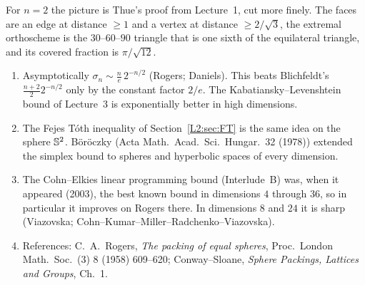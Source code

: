 For $n=2$ the picture is Thue's proof from Lecture~1, cut more finely. The faces are an edge at
distance $\ge1$ and a vertex at distance $\ge2/\sqrt3$, the extremal orthoscheme is the $30$--$60$--$90$
triangle that is one sixth of the equilateral triangle, and its covered fraction is $\pi/\sqrt{12}$.

\begin{remark}
\begin{enumerate}[nosep]
\item Asymptotically $\sigma_n\sim\frac{n}{e}\,2^{-n/2}$ (Rogers; Daniels). This beats Blichfeldt's
  $\frac{n+2}{2}2^{-n/2}$ only by the constant factor $2/e$. The Kabatiansky--Levenshtein bound of
  Lecture~3 is exponentially better in high dimensions.
\item The Fejes T\'oth inequality of Section~\ref{L2:sec:FT} is the same idea on the sphere $\mathbb{S}^2$.
  B\"or\"oczky (Acta Math.\ Acad.\ Sci.\ Hungar.\ 32 (1978)) extended the simplex bound to spheres and
  hyperbolic spaces of every dimension.
\item The Cohn--Elkies linear programming bound (Interlude~B) was, when it appeared (2003), the best known
  bound in dimensions $4$ through $36$, so in particular it improves on Rogers there. In dimensions $8$
  and $24$ it is sharp (Viazovska; Cohn--Kumar--Miller--Radchenko--Viazovska).
\item References: C.~A.~Rogers, \emph{The packing of equal spheres}, Proc.\ London Math.\ Soc.\ (3) 8
  (1958) 609--620; Conway--Sloane, \emph{Sphere Packings, Lattices and Groups}, Ch.~1.
\end{enumerate}
\end{remark}
